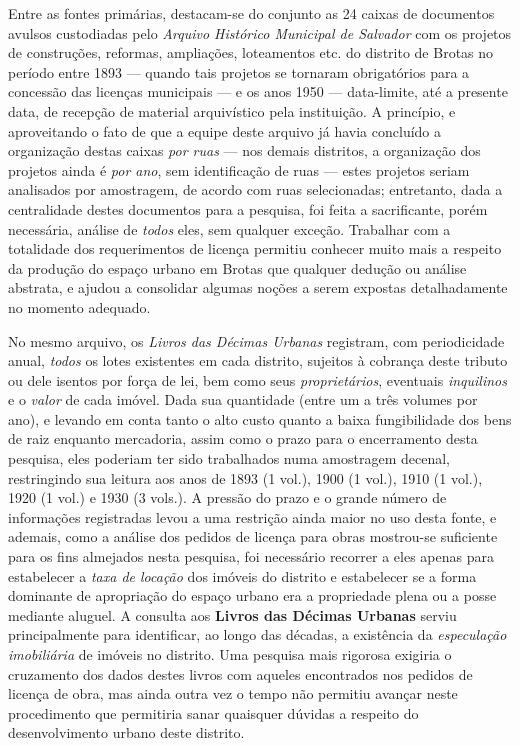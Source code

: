 Entre as fontes primárias, destacam-se do conjunto as 24 caixas de documentos avulsos custodiadas pelo \textit{Arquivo Histórico Municipal de Salvador} com os projetos de construções, reformas, ampliações, loteamentos etc. do distrito de Brotas no período entre 1893 --- quando tais projetos se tornaram obrigatórios para a concessão das licenças municipais --- e os anos 1950 --- data-limite, até a presente data, de recepção de material arquivístico pela instituição. A princípio, e aproveitando o fato de que a equipe deste arquivo já havia concluído a organização destas caixas \textit{por ruas} --- nos demais distritos, a organização dos projetos ainda é \textit{por ano}, sem identificação de ruas --- estes projetos seriam analisados por amostragem, de acordo com ruas selecionadas; entretanto, dada a centralidade destes documentos para a pesquisa, foi feita a sacrificante, porém necessária, análise de \textit{todos} eles, sem qualquer exceção. Trabalhar com a totalidade dos requerimentos de licença permitiu conhecer muito mais a respeito da produção do espaço urbano em Brotas que qualquer dedução ou análise abstrata, e ajudou a consolidar algumas noções a serem expostas detalhadamente no momento adequado.

No mesmo arquivo, os \textit{Livros das Décimas Urbanas} registram, com periodicidade anual, \textit{todos} os lotes existentes em cada distrito, sujeitos à cobrança deste tributo ou dele isentos por força de lei, bem como seus \textit{proprietários}, eventuais \textit{inquilinos} e o \textit{valor} de cada imóvel. Dada sua quantidade (entre um a três volumes por ano), e levando em conta tanto o alto custo quanto a baixa fungibilidade dos bens de raiz enquanto mercadoria, assim como o prazo para o encerramento desta pesquisa, eles poderiam ter sido trabalhados numa amostragem decenal, restringindo sua leitura aos anos de 1893 (1 vol.), 1900 (1 vol.), 1910 (1 vol.), 1920 (1 vol.) e 1930 (3 vols.). A pressão do prazo e o grande número de informações registradas levou a uma restrição ainda maior no uso desta fonte, e ademais, como a análise dos pedidos de licença para obras mostrou-se suficiente para os fins almejados nesta pesquisa, foi necessário recorrer a eles apenas para estabelecer a \textit{taxa de locação} dos imóveis do distrito e estabelecer se a forma dominante de apropriação do espaço urbano era a propriedade plena ou a posse mediante aluguel. A consulta aos \textbf{Livros das Décimas Urbanas} serviu principalmente para identificar, ao longo das décadas, a existência da \textit{especulação imobiliária} de imóveis no distrito. Uma pesquisa mais rigorosa exigiria o cruzamento dos dados destes livros com aqueles encontrados nos pedidos de licença de obra, mas ainda outra vez o tempo não permitiu avançar neste procedimento que permitiria sanar quaisquer dúvidas a respeito do desenvolvimento urbano deste distrito.

